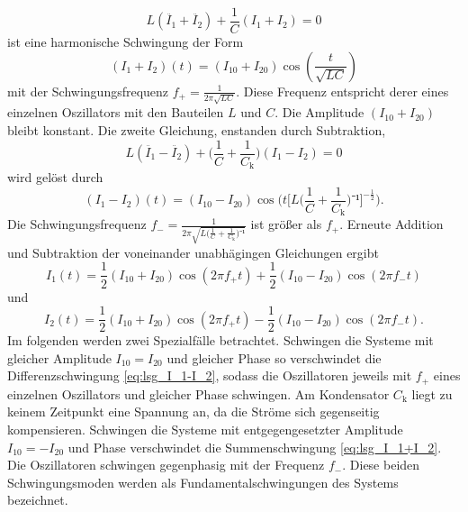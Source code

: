 \begin{equation}
	L(\ddot{I_1}+\ddot{I_2})+\frac{1}{C}({I_1}+{I_2})=0
	\label{eq:I_1+I_2}
\end{equation}
ist eine harmonische Schwingung der Form
\begin{equation}
	({I_1}+{I_2})(t)=({I_{10}}+{I_{20}})\cos(\frac{t}{\sqrt{LC}})
\end{equation}
mit der Schwingungsfrequenz $f_+=\frac{1}{2\pi\sqrt{LC}}$.
Diese Frequenz entspricht derer eines einzelnen Oszillators mit den Bauteilen $L$ und $C$.
 Die Amplitude $({I_10}+{I_20})$ bleibt konstant.
Die zweite Gleichung, enstanden durch Subtraktion,
\begin{equation}
	L(\ddot{I_1}-\ddot{I_2})+\bigl(\frac{1}{C}+\frac{1}{C_\mathup{k}}\bigr)({I_1}-{I_2})=0
	\label{eq:I_1-I_2}
\end{equation}
wird gelöst durch
\begin{equation}
	({I_1}-{I_2})(t)=({I_{10}}-{I_{20}})\cos\biggl(t{\biggl[L\biggl({\frac{1}{C}+\frac{1}{C_\mathup{k}}}\biggr)⁻¹\biggr]^{-\frac{1}{2}}}\biggr).
\end{equation}
Die Schwingungsfrequenz $f_-=\frac{1}{2\pi\sqrt{L\bigl({\frac{1}{C}+\frac{1}{C_\mathup{k}}}\bigr)⁻¹}}$ ist größer als $f_+$.
Erneute Addition und Subtraktion der voneinander unabhägingen Gleichungen ergibt
\begin{equation}
	I_1(t)=\frac{1}{2}({I_{10}}+{I_{20}})\cos(2\pi f_+t)+\frac{1}{2}({I_{10}}-{I_{20}})\cos(2\pi f_-t)
	\label{eq:I_1_ur}
\end{equation}
und
\begin{equation}
	I_2(t)=\frac{1}{2}({I_{10}}+{I_{20}})\cos(2\pi f_+ t)-\frac{1}{2}({I_{10}}-{I_{20}})\cos(2\pi f_- t).
	\label{eq:I_2_ur}
\end{equation}
Im folgenden werden zwei Spezialfälle betrachtet. 
Schwingen die Systeme mit gleicher Amplitude $I_{10}=I_{20}$ und gleicher Phase so verschwindet die Differenzschwingung \eqref{eq:lsg_I_1-I_2}, sodass die Oszillatoren jeweils mit $f_+$ eines einzelnen Oszillators und gleicher Phase schwingen.
 Am Kondensator $C_\mathup{k}$ liegt zu keinem Zeitpunkt eine Spannung an, da die Ströme sich gegenseitig kompensieren.
Schwingen die Systeme mit entgegengesetzter Amplitude  $I_{10}=-I_{20}$ und Phase verschwindet die Summenschwingung \eqref{eq:lsg_I_1+I_2}. Die Oszillatoren schwingen gegenphasig mit der Frequenz $f_-$.
Diese beiden Schwingungsmoden werden als Fundamentalschwingungen des Systems bezeichnet.

